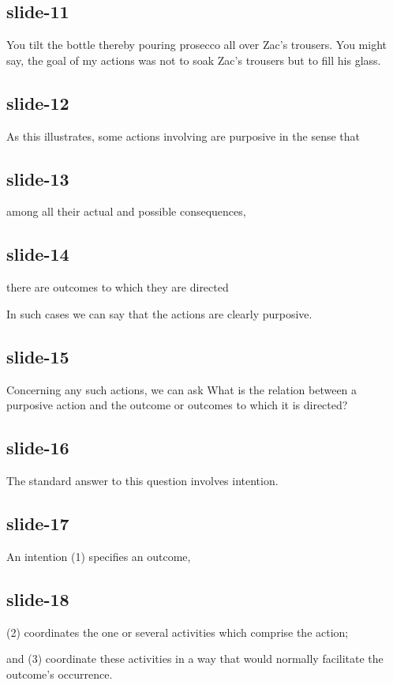 \documentclass[12pt,\papersize]{extarticle}
\begin{document}
\subsection{slide-11}
You tilt the bottle thereby pouring prosecco all over Zac's trousers.
You might say, the goal of my actions was not to soak Zac's trousers but to
fill his glass.
 
\subsection{slide-12}
As this illustrates,
some actions involving are purposive in the sense that
 
\subsection{slide-13}
among all their actual and possible consequences,
 
\subsection{slide-14}
there are outcomes to which they are directed
 
In such cases we can say that the actions are clearly purposive.
 
\subsection{slide-15}
Concerning any such actions, we can ask
What is the relation between a purposive action and the outcome or outcomes to which it is directed?
 
\subsection{slide-16}
The standard answer to this question involves intention.
 
\subsection{slide-17}
An intention (1) specifies an outcome,
 
\subsection{slide-18}
(2) coordinates the one or several activities which comprise the action;
 
and (3) coordinate these activities in a way that would normally facilitate the outcome’s occurrence.
 
\end{document}
